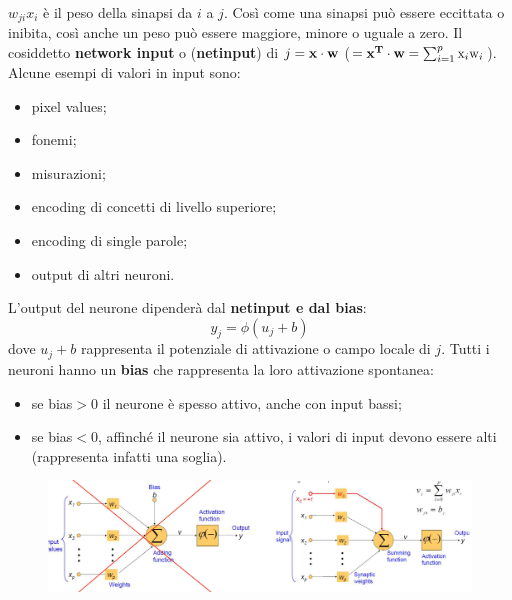$w_{ji}x_i$ è il peso della sinapsi da $i$ a $j$. Così come una sinapsi può essere eccittata o inibita, così anche un peso può essere maggiore, minore o uguale a zero.
\newline
\newline
Il cosiddetto \textbf{network input} o (\textbf{netinput}) di $j=\text{\textbf{x}}\cdot\text{\textbf{w}}$ ($=\text{\textbf{x$^{\text{T}}$}}\cdot\text{\textbf{w}}=\sum_{i=1}^p\text{x}_i\text{w}_i$).
\newline
\newline
Alcune esempi di valori in input sono:
\begin{itemize}
    \item pixel values;
    \item fonemi;
    \item misurazioni;
    \item encoding di concetti di livello superiore;
    \item encoding di single parole;
    \item output di altri neuroni.
\end{itemize}
L'output del neurone dipenderà dal \textbf{netinput e dal bias}:
\begin{equation}
    y_j=\phi(u_j+b)
\end{equation}
dove $u_j+b$ rappresenta il potenziale di attivazione o campo locale di $j$.
\newpage
Tutti i neuroni hanno un \textbf{bias} che rappresenta la loro attivazione spontanea:
\begin{itemize}
    \item se bias$>0$ il neurone è spesso attivo, anche con input bassi;
    \item se bias$<0$, affinché il neurone sia attivo, i valori di input devono essere alti (rappresenta infatti una soglia).
\end{itemize}


\begin{figure}[!h]
    \includegraphics[scale=.4]{images/perceptron/architecture.png}
    \centering
\end{figure}


